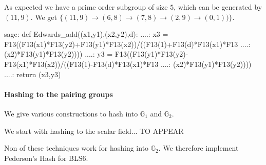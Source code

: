 As expected we have a prime order subgroup of size $5$, which can be generated by $(11,9)$. We get $\{(11,9)\to (6,8)\to (7,8) \to (2,9) \to (0,1))\}$.

\begin{sagecommandline}
sage: def Edwards_add((x1,y1),(x2,y2),d):
....:     x3 = F13((F13(x1)*F13(y2)+F13(y1)*F13(x2))/((F13(1)+F13(d)*F13(x1)*F13
....: (x2)*F13(y1)*F13(y2))))
....:     y3 = F13((F13(y1)*F13(y2)-F13(x1)*F13(x2))/((F13(1)-F13(d)*F13(x1)*F13
....: (x2)*F13(y1)*F13(y2))))
....:     return (x3,y3)
\end{sagecommandline}

\paragraph{Hashing to the pairing groups}
We give various constructions to hash into $\mathbb{G}_1$ and $\mathbb{G}_2$. 

We start with hashing to the scalar field... TO APPEAR

Non of these techniques work for hashing into $\mathbb{G}_2$. We therefore implement Pederson's Hash for BLS6. 

